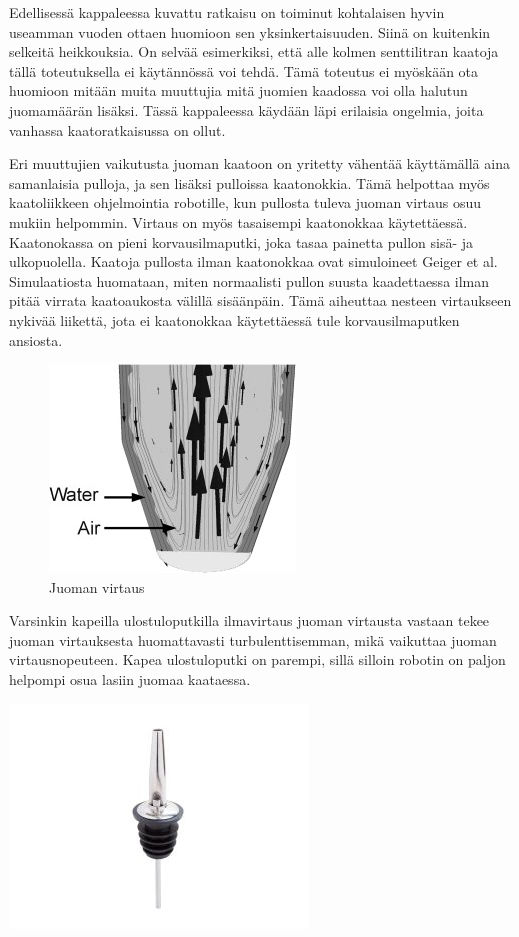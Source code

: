 Edellisessä kappaleessa kuvattu ratkaisu on toiminut kohtalaisen hyvin useamman vuoden ottaen huomioon sen yksinkertaisuuden. Siinä on kuitenkin selkeitä heikkouksia. On selvää esimerkiksi, että alle kolmen senttilitran kaatoja tällä toteutuksella ei käytännössä voi tehdä. Tämä toteutus ei myöskään ota huomioon mitään muita muuttujia mitä juomien kaadossa voi olla halutun juomamäärän lisäksi. Tässä kappaleessa käydään läpi erilaisia ongelmia, joita vanhassa kaatoratkaisussa on ollut.

Eri muuttujien vaikutusta juoman kaatoon on yritetty vähentää käyttämällä aina samanlaisia pulloja, ja sen lisäksi pulloissa kaatonokkia. Tämä helpottaa myös kaatoliikkeen ohjelmointia robotille, kun pullosta tuleva juoman virtaus osuu mukiin helpommin. Virtaus on myös tasaisempi kaatonokkaa käytettäessä. Kaatonokassa on pieni korvausilmaputki, joka tasaa painetta pullon sisä- ja ulkopuolella. Kaatoja pullosta ilman kaatonokkaa ovat simuloineet Geiger et al. Simulaatiosta huomataan, miten normaalisti pullon suusta kaadettaessa ilman pitää virrata kaatoaukosta välillä sisäänpäin. Tämä aiheuttaa nesteen virtaukseen nykivää liikettä, jota ei kaatonokkaa käytettäessä tule korvausilmaputken ansiosta.

\begin{figure}
\begin{center}
\includegraphics{img/Geiger et al. juoman virtaus.jpg}
\end{center}
\caption{Juoman virtaus}
\label{fig:juomien_virtaus}
\end{figure}

Varsinkin kapeilla ulostuloputkilla ilmavirtaus juoman virtausta vastaan tekee juoman virtauksesta huomattavasti turbulenttisemman, mikä vaikuttaa juoman virtausnopeuteen. \cite{Geiger2012} Kapea ulostuloputki on parempi, sillä silloin robotin on paljon helpompi osua lasiin juomaa kaataessa.

\begin{center}
\includegraphics{img/kaatonokka_nettikauppa.jpg}
\end{center}

